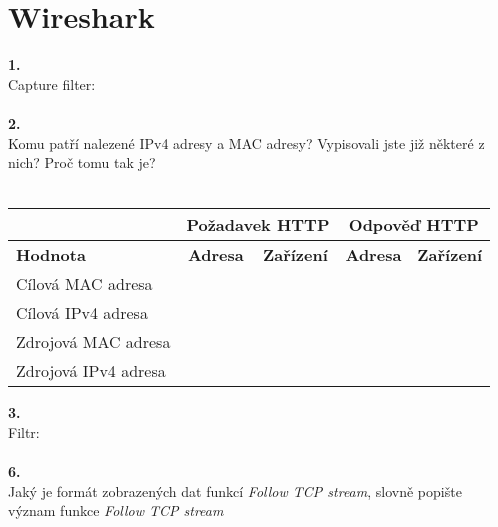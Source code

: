 \section{Wireshark}
\textbf{1.}\\
Capture filter:\\
\\
\textbf{2.}\\
Komu patří nalezené IPv4 adresy a MAC adresy? Vypisovali jste již některé z nich? Proč tomu tak je?\\
\\
\begin{tabular}{|l|c|c|c|c|}
\hline
& \multicolumn{2}{|c|}{\textbf{Požadavek HTTP}} & \multicolumn{2}{|c|}{\textbf{Odpověď HTTP}}\\
\hline
\textbf{Hodnota} & \textbf{Adresa} & \textbf{Zařízení} & \textbf{Adresa} & \textbf{Zařízení}\\
\hline
Cílová MAC adresa & \hspace{8em} & \hspace{6em} & \hspace{8em} & \hspace{6em} \\
\hline
Cílová IPv4 adresa & & & & \\
\hline
Zdrojová MAC adresa & & & & \\
\hline
Zdrojová IPv4 adresa & & & & \\
\hline
\end{tabular}
\vspace{2em}

\textbf{3.}\\
Filtr:\\
\\
\textbf{6.}\\
Jaký je formát zobrazených dat funkcí \emph{Follow TCP stream}, slovně popište
význam funkce \emph{Follow TCP stream}\\
